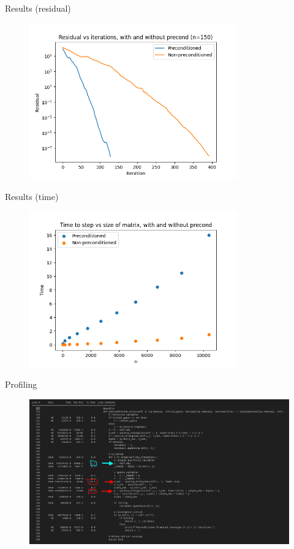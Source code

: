 \documentclass[11pt,aspectratio=1610]{beamer}
\begin{document}
\begin{frame}{Results (residual)}
\begin{figure}
	\includegraphics[width=0.8\textwidth]{../images/residual_test.png}
\end{figure}
\end{frame}

\begin{frame}{Results (time)}
\begin{figure}
	\includegraphics[width=0.8\textwidth]{../images/time_test.png}
\end{figure}
\end{frame}

\begin{frame}{Profiling}
\begin{figure}
    \includegraphics[width=\textwidth]{../images/line_profiler.png}
\end{figure}

\end{frame}
\end{document}
